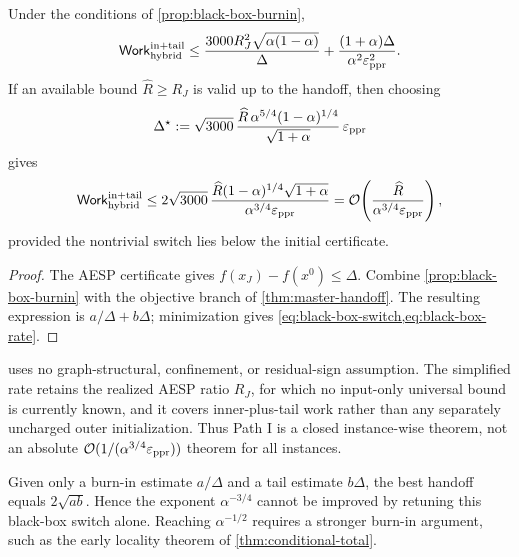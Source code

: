 \begin{corollary}
\label{cor:black-box-rate}
Under the conditions of \cref{prop:black-box-burnin},
\begin{equation}
  \mathsf{Work}_{\rm hybrid}^{\rm in+tail}
  \leq
  \frac{3000R_J^2\sqrt{\alpha(1-\alpha)}}{\Delta}
  +\frac{(1+\alpha)\Delta}{\alpha^2\varepsilon_{\mathrm{ppr}}^2}.
  \label{eq:black-box-tradeoff}
\end{equation}
If an available bound $\widehat R\geq R_J$ is valid up to the handoff, then
choosing
\begin{equation}
  \Delta^\star
  :=
  \sqrt{3000}\,
  \frac{\widehat R\,\alpha^{5/4}(1-\alpha)^{1/4}}
       {\sqrt{1+\alpha}}\,\varepsilon_{\mathrm{ppr}}
  \label{eq:black-box-switch}
\end{equation}
gives
\begin{equation}
  \mathsf{Work}_{\rm hybrid}^{\rm in+tail}
  \leq
  2\sqrt{3000}\,
  \frac{\widehat R(1-\alpha)^{1/4}\sqrt{1+\alpha}}
       {\alpha^{3/4}\varepsilon_{\mathrm{ppr}}}
  =\mathcal O\!\left(\frac{\widehat R}{\alpha^{3/4}\varepsilon_{\mathrm{ppr}}}\right),
  \label{eq:black-box-rate}
\end{equation}
provided the nontrivial switch lies below the initial certificate.
\end{corollary}

\begin{proof}
The AESP certificate gives $f(x_J)-f(x^0)\leq\Delta$.
Combine \cref{prop:black-box-burnin} with the objective branch of
\cref{thm:master-handoff}.  The resulting expression is $a/\Delta+b\Delta$;
minimization gives \cref{eq:black-box-switch,eq:black-box-rate}.
\end{proof}

\begin{remark}
 uses no graph-structural, confinement, or
residual-sign assumption.  The simplified rate retains the realized AESP
ratio $R_J$, for which no input-only universal bound is currently known, and
it covers inner-plus-tail work rather than any separately uncharged outer
initialization.  Thus Path I is a closed instance-wise theorem, not an
absolute $\mathcal O(1/(\alpha^{3/4}\varepsilon_{\mathrm{ppr}}))$ theorem for all instances.
\end{remark}

\begin{remark}
Given only a burn-in estimate $a/\Delta$ and a tail estimate $b\Delta$, the
best handoff equals $2\sqrt{ab}$.  Hence the exponent $\alpha^{-3/4}$ cannot be
improved by retuning this black-box switch alone.  Reaching
$\alpha^{-1/2}$ requires a stronger burn-in argument, such as the early
locality theorem of \cref{thm:conditional-total}.
\end{remark}

